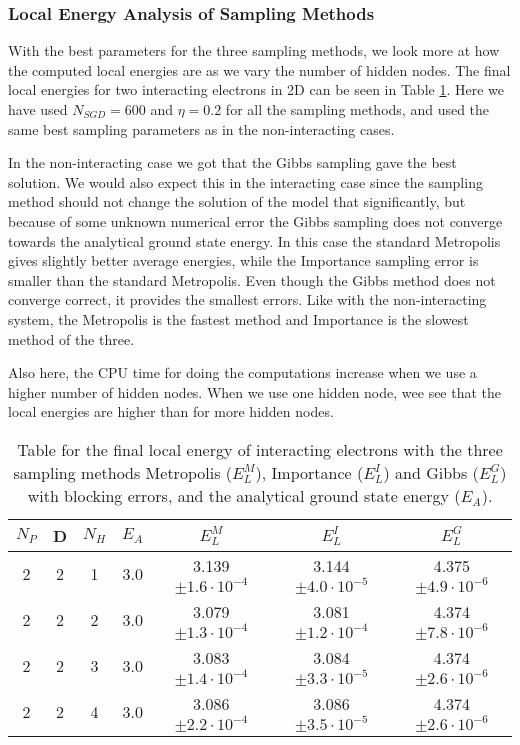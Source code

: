 \documentclass[12pt,a4paper,english]{article}
\begin{document}
\newpage
\subsubsection{Local Energy Analysis of Sampling Methods}
\label{subsubsect:Results_int_Analysis}
With the best parameters for the three sampling methods, we look more at how the computed local energies are as we vary the number of hidden nodes. The final local energies for two interacting electrons in 2D can be seen in Table \ref{tab:Int_energies}. Here we have used $N_{SGD}=600$ and $\eta=0.2$ for all the sampling methods, and used the same best sampling parameters as in the non-interacting cases.

In the non-interacting case we got that the Gibbs sampling gave the best solution. We would also expect this in the interacting case since the sampling method should not change the solution of the model that significantly, but because of some unknown numerical error the Gibbs sampling does not converge towards the analytical ground state energy. In this case the standard Metropolis gives slightly better average energies, while the Importance sampling error is smaller than the standard Metropolis. Even though the Gibbs method does not converge correct, it provides the smallest errors. Like with the non-interacting system, the Metropolis is the fastest method and Importance is the slowest method of the three.

Also here, the CPU time for doing the computations increase when we use a higher number of hidden nodes. When we use one hidden node, wee see that the local energies are higher than for more hidden nodes.

\begin{table}[htbp!]
	\centering
	\begin{tabular}{ |c|c|c|c|c|c|c| }
		\hline \rule{0pt}{13pt}
		$N_P$ & D & $N_H$ & $E_A$ & $E_L^M$ & $E_L^I$ & $E_L^G$ \\
		\hline \rule{0pt}{13pt}%
		2 & 2 & 1 & 3.0 & 3.139$\pm1.6\cdot10^{-4}$ & 3.144$\pm4.0\cdot10^{-5}$ & 4.375$\pm4.9\cdot10^{-6}$ \\
		2 & 2 & 2 & 3.0 & 3.079$\pm1.3\cdot10^{-4}$ & 3.081$\pm1.2\cdot10^{-4}$ & 4.374$\pm7.8\cdot10^{-6}$ \\
		2 & 2 & 3 & 3.0 & 3.083$\pm1.4\cdot10^{-4}$ & 3.084$\pm3.3\cdot10^{-5}$ & 4.374$\pm2.6\cdot10^{-6}$ \\
		2 & 2 & 4 & 3.0 & 3.086$\pm2.2\cdot10^{-4}$ & 3.086$\pm3.5\cdot10^{-5}$ & 4.374$\pm2.6\cdot10^{-6}$ \\
		\hline
	\end{tabular}	
	\caption{Table for the final local energy of interacting electrons with the three sampling methods Metropolis ($E_L^M$), Importance ($E_L^I$) and Gibbs ($E_L^G$) with blocking errors, and the analytical ground state energy ($E_A$). \label{tab:Int_energies}}
\end{table}
\end{document}
